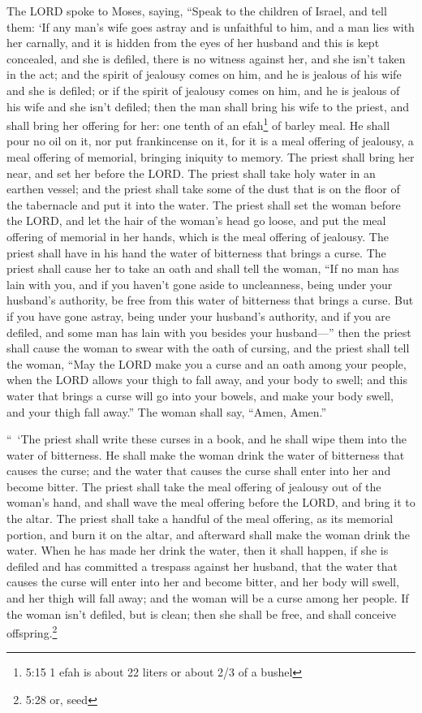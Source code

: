 \myverse{}The LORD spoke to Moses, saying,
\myverse{}“Speak to the children of Israel, and tell them: ‘If any man’s wife goes astray
and is unfaithful to him,
\myverse{}and a man lies with her carnally, and it is hidden from the eyes of her husband
and this is kept concealed, and she is defiled, there is no witness against her, and she isn’t taken in
the act;
\myverse{}and the spirit of jealousy comes on him, and he is jealous of his wife and
she is defiled; or if the spirit of jealousy comes on him, and he is jealous of his wife and she isn’t
defiled;
\myverse{}then the man shall bring his wife to the priest, and shall bring her offering
for her: one tenth of an efah\footnote{ 5:15 1 efah is about 22 liters or about 2/3 of a bushel} of barley meal. He shall pour no
oil on it, nor put frankincense on it, for it is a meal offering of jealousy, a meal offering of memorial,
bringing iniquity to memory.
\myverse{}The priest shall bring her near, and set her before the LORD.
\myverse{}The priest shall take holy water in an earthen vessel; and the priest shall
take some of the dust that is on the floor of the tabernacle and put it into the water.
\myverse{}The priest shall set the woman before the LORD, and let the hair of the woman’s
head go loose, and put the meal offering of memorial in her hands, which is the meal offering of jealousy.
The priest shall have in his hand the water of bitterness that brings a curse.
\myverse{}The priest shall cause her to take an oath and shall tell the woman, “If no
man has lain with you, and if you haven’t gone aside to uncleanness, being under your husband’s authority,
be free from this water of bitterness that brings a curse.
\myverse{}But if you have gone astray, being under your husband’s authority, and if
you are defiled, and some man has lain with you besides your husband—”
\myverse{}then the priest shall cause the woman to swear with the oath of cursing, and
the priest shall tell the woman, “May the LORD make you a curse and an oath among your people, when the
LORD allows your thigh to fall away, and your body to swell;
\myverse{}and this water that brings a curse will go into your bowels, and make your
body swell, and your thigh fall away.” The woman shall say, “Amen, Amen.”


\myverse{}“ ‘The priest shall write these curses in a book, and he shall
wipe them into the water of bitterness.
\myverse{}He shall make the woman drink the water of bitterness that causes the curse;
and the water that causes the curse shall enter into her and become bitter.
\myverse{}The priest shall take the meal offering of jealousy out of the woman’s hand,
and shall wave the meal offering before the LORD, and bring it to the altar.
\myverse{}The priest shall take a handful of the meal offering, as its memorial portion,
and burn it on the altar, and afterward shall make the woman drink the water.
\myverse{}When he has made her drink the water, then it shall happen, if she is defiled
and has committed a trespass against her husband, that the water that causes the curse will enter into
her and become bitter, and her body will swell, and her thigh will fall away; and the woman will be a
curse among her people.
\myverse{}If the woman isn’t defiled, but is clean; then she shall be free, and shall
conceive offspring.\footnote{ 5:28 or, seed}


